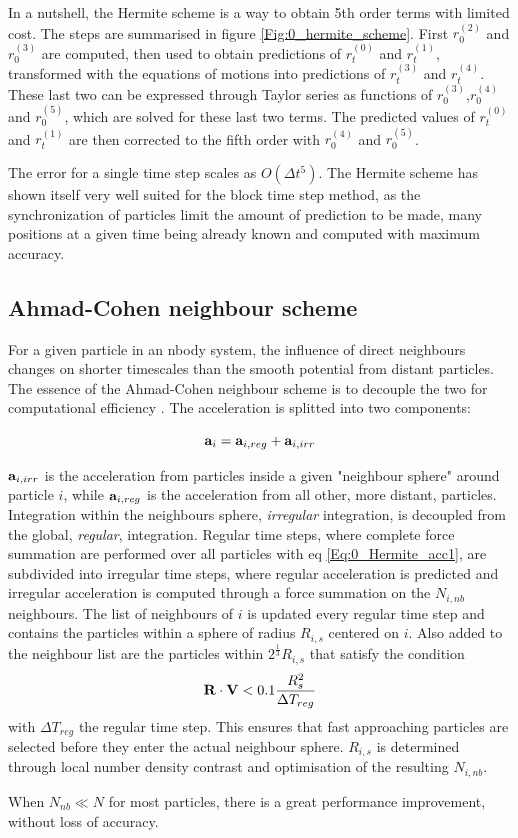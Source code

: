 In a nutshell, the Hermite scheme is a way to obtain 5th order terms with limited cost. The steps are summarised in figure \ref{Fig:0_hermite_scheme}. First $r_0^{(2)}$ and $r_0^{(3)}$ are computed, then used to obtain predictions of $r_t^{(0)}$ and $r_t^{(1)}$, transformed with the equations of motions into predictions of $r_t^{(3)}$ and $r_t^{(4)}$. These last two can be expressed through Taylor series as functions of $r_0^{(3)}$,$r_0^{(4)}$ and $r_0^{(5)}$, which are solved for these last two terms. The predicted values of $r_t^{(0)}$ and $r_t^{(1)}$ are then corrected to the fifth order with $r_0^{(4)}$ and $r_0^{(5)}$.

The error for a single time step scales as $O(\Delta t^5)$. The Hermite scheme has shown itself very well suited for the block time step method, as the synchronization of particles limit the amount of prediction to be made, many positions at a given time being already known and computed with maximum accuracy.


\subsection{Ahmad-Cohen neighbour scheme}

For a given particle in an nbody system, the influence of direct neighbours changes on shorter timescales than the smooth potential from distant particles. The essence of the Ahmad-Cohen neighbour scheme is to decouple the two for computational efficiency \citep{AhmadCohen1973}. The acceleration is splitted into two components:

\begin{equation}
\bold{a}_i = \bold{a}_{i,reg} + \bold{a}_{i,irr}
\end{equation}

$\bold{a}_{i,irr}$ is the acceleration from particles inside a given "neighbour sphere" around particle $i$, while $\bold{a}_{i,reg}$ is the acceleration from all other, more distant, particles. Integration within the neighbours sphere,  \textit{irregular} integration, is decoupled from the global, \textit{regular}, integration. Regular time steps, where complete force summation are performed over all particles with eq \ref{Eq:0_Hermite_acc1}, are subdivided into irregular time steps, where regular acceleration is predicted and irregular acceleration is computed through a force summation on the $N_{i,nb}$ neighbours. The list of neighbours of $i$ is updated every regular time step and contains the particles within a sphere of radius $R_{i,s}$ centered on $i$. Also added to the neighbour list are the particles within $2^{\frac{1}{3}}R_{i,s} $ that satisfy the condition
\begin{equation}
\bold{R} \cdot \bold{V} < 0.1 \frac{R_s^2}{\Delta T_{reg}}
\end{equation}
with $\Delta T_{reg}$ the regular time step. This ensures that fast approaching particles are selected before they enter the actual neighbour sphere. $R_{i,s}$ is determined through local number density contrast and optimisation of the resulting $N_{i,nb}$. 

When $N_{nb} \ll N$ for most particles, there is a great performance improvement, without loss of accuracy. 












